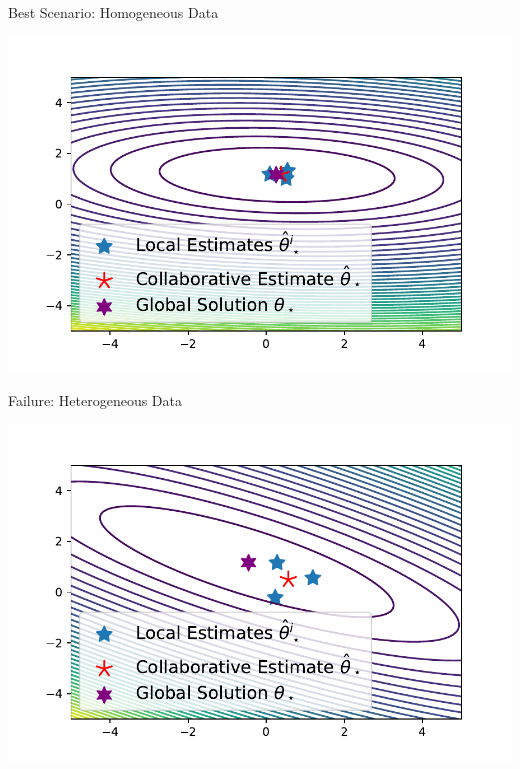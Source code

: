 \documentclass[aspectratio=169,14pt]{beamer}
\begin{document}
\begin{frame}{Best Scenario: Homogeneous Data}
  \vspace{-2em}
  \begin{center}
    \includegraphics[width=0.8\linewidth]{images/all-minimums-homogeneous.pdf}
  \end{center}
\end{frame}

\begin{frame}{Failure: Heterogeneous Data}
  \vspace{-2em}
  \begin{center}
    \includegraphics[width=0.8\linewidth]{images/all-minimums-heterogeneous.pdf}
  \end{center}
\end{frame}
\end{document}
